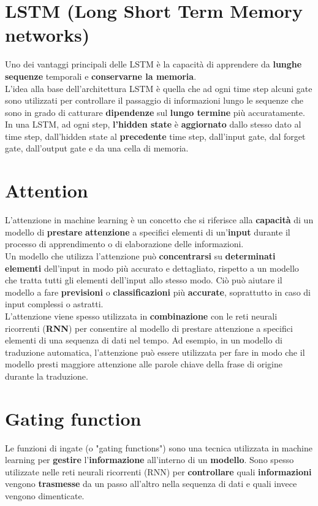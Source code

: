 \documentclass{article}
\begin{document}
\section{LSTM (Long Short Term Memory networks)}
Uno dei vantaggi principali delle LSTM è la capacità di apprendere da \textbf{lunghe sequenze} temporali e \textbf{conservarne la memoria}.\\
L’idea alla base dell’architettura LSTM è quella che ad ogni time step alcuni gate sono utilizzati per controllare il passaggio di informazioni lungo le sequenze che sono in grado di catturare \textbf{dipendenze} sul \textbf{lungo termine} più accuratamente. In una LSTM, ad ogni step,\textbf{ l’hidden state} è \textbf{aggiornato} dallo stesso dato al time step, dall’hidden state al \textbf{precedente} time step, dall’input gate, dal forget gate, dall’output gate e da una cella di memoria.

\section{Attention}
L'attenzione in machine learning è un concetto che si riferisce alla \textbf{capacità} di un modello di \textbf{prestare} \textbf{attenzione} a specifici elementi di un'\textbf{input} durante il processo di apprendimento o di elaborazione delle informazioni.\\

Un modello che utilizza l'attenzione può \textbf{concentrarsi} su \textbf{determinati} \textbf{elementi} dell'input in modo più accurato e dettagliato, rispetto a un modello che tratta tutti gli elementi dell'input allo stesso modo. Ciò può aiutare il modello a fare \textbf{previsioni} o \textbf{classificazioni} più \textbf{accurate}, soprattutto in caso di input complessi o astratti.\\

L'attenzione viene spesso utilizzata in \textbf{combinazione} con le reti neurali ricorrenti (\textbf{RNN}) per consentire al modello di prestare attenzione a specifici elementi di una sequenza di dati nel tempo. Ad esempio, in un modello di traduzione automatica, l'attenzione può essere utilizzata per fare in modo che il modello presti maggiore attenzione alle parole chiave della frase di origine durante la traduzione.

\section{Gating function}
Le funzioni di ingate (o "gating functions") sono una tecnica utilizzata in machine learning per \textbf{gestire} l'\textbf{informazione} all'interno di un \textbf{modello}. Sono spesso utilizzate nelle reti neurali ricorrenti (RNN) per \textbf{controllare} quali \textbf{informazioni} vengono \textbf{trasmesse} da un passo all'altro nella sequenza di dati e quali invece vengono dimenticate.\\
\end{document}
